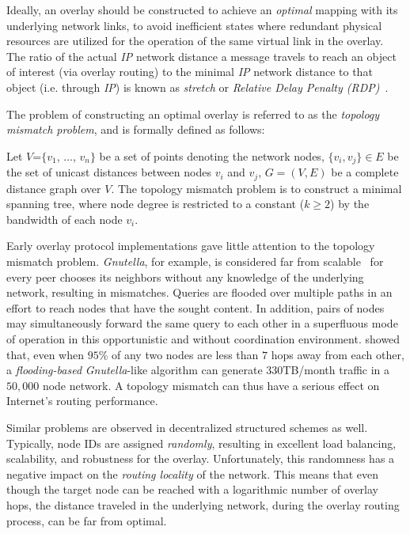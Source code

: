 Ideally, an overlay should be constructed to achieve an \emph{optimal} 
mapping with its underlying network links, to avoid
inefficient states where redundant physical resources are utilized for the
operation of the same virtual link in the overlay. The ratio of the actual
\emph{IP} network distance a message travels to reach an object of interest
(via overlay routing) to the minimal \emph{IP} network distance to that object
(i.e. through \emph{IP}) is known as \emph{stretch} or
\emph{Relative Delay Penalty (RDP)}~\cite{CRZ2000}.

The problem of constructing an optimal overlay is referred to as the
\emph{topology mismatch problem}, and is formally defined as follows:

\begin{definition}
Let $V$=$\{v_1$, $\dots$, $v_n\}$ be a set of points denoting the network nodes,
$\{v_i, v_j\} \in E$ be the set of unicast distances between nodes $v_i$ and
$v_j$, $G=(V,E)$ be a complete distance graph over $V$. The topology mismatch
problem is to construct a minimal spanning tree, where node degree is
restricted to a constant ($k\geq 2$) by the bandwidth of each node $v_i$.
\end{definition}

Early overlay protocol implementations gave little attention to the 
topology mismatch problem.
\emph{Gnutella}, for example, is
considered far from scalable~\cite{ritter_gnucantscale_2001} for every peer
chooses its neighbors without any knowledge of the underlying
network, resulting in mismatches. 
Queries are flooded over multiple paths in an effort 
to reach nodes that have the sought content. 
In addition, 
pairs of nodes may simultaneously forward the same query to each other
in a superfluous mode of operation in 
this opportunistic and without coordination environment.
\cite{matei_mapgnutella_2002} showed that, even when $95$\% of any two nodes 
are less than $7$ hops away from each other, 
a \emph{flooding-based} \emph{Gnutella}-like algorithm 
can generate $330$TB/month traffic in a $50,000$ node network. 
A topology mismatch can thus have a serious effect 
on Internet's routing performance.

Similar problems are observed in decentralized structured schemes as well.
Typically, node IDs are assigned \emph{randomly}, resulting in excellent load
balancing, scalability, and robustness for the overlay. Unfortunately, this
randomness has a negative impact on the \emph{routing locality} of the network.
This means that even though the target node can be reached with a logarithmic
number of overlay hops, the distance traveled in the underlying network, 
during the overlay routing process, can be far from optimal.  

